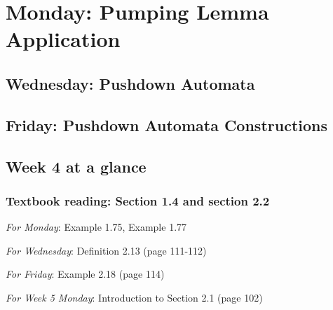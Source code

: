 \newpage

\section*{Monday: Pumping Lemma Application}


    
\newpage
\subsection*{Wednesday: Pushdown Automata}




\newpage
\subsection*{Friday: Pushdown Automata Constructions}



\newpage

\subsection*{Week 4 at a glance}

\subsubsection*{Textbook reading: Section 1.4 and section 2.2}

{\it For Monday}: Example 1.75, Example 1.77

{\it For Wednesday}: Definition 2.13 (page 111-112)

{\it For Friday}: Example 2.18 (page 114)

{\it For Week 5 Monday}: Introduction to Section 2.1 (page 102)


